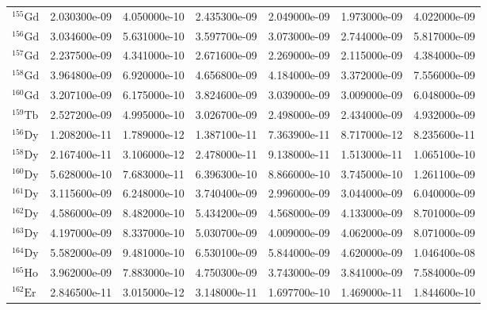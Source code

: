 \begin{tabular}{lrrrrrr}
$^{155}\mathrm{Gd}$ &       2.030300e-09 &      4.050000e-10 &      2.435300e-09 &       2.049000e-09 &      1.973000e-09 &      4.022000e-09 \\
$^{156}\mathrm{Gd}$ &       3.034600e-09 &      5.631000e-10 &      3.597700e-09 &       3.073000e-09 &      2.744000e-09 &      5.817000e-09 \\
$^{157}\mathrm{Gd}$ &       2.237500e-09 &      4.341000e-10 &      2.671600e-09 &       2.269000e-09 &      2.115000e-09 &      4.384000e-09 \\
$^{158}\mathrm{Gd}$ &       3.964800e-09 &      6.920000e-10 &      4.656800e-09 &       4.184000e-09 &      3.372000e-09 &      7.556000e-09 \\
$^{160}\mathrm{Gd}$ &       3.207100e-09 &      6.175000e-10 &      3.824600e-09 &       3.039000e-09 &      3.009000e-09 &      6.048000e-09 \\
$^{159}\mathrm{Tb}$ &       2.527200e-09 &      4.995000e-10 &      3.026700e-09 &       2.498000e-09 &      2.434000e-09 &      4.932000e-09 \\
$^{156}\mathrm{Dy}$ &       1.208200e-11 &      1.789000e-12 &      1.387100e-11 &       7.363900e-11 &      8.717000e-12 &      8.235600e-11 \\
$^{158}\mathrm{Dy}$ &       2.167400e-11 &      3.106000e-12 &      2.478000e-11 &       9.138000e-11 &      1.513000e-11 &      1.065100e-10 \\
$^{160}\mathrm{Dy}$ &       5.628000e-10 &      7.683000e-11 &      6.396300e-10 &       8.866000e-10 &      3.745000e-10 &      1.261100e-09 \\
$^{161}\mathrm{Dy}$ &       3.115600e-09 &      6.248000e-10 &      3.740400e-09 &       2.996000e-09 &      3.044000e-09 &      6.040000e-09 \\
$^{162}\mathrm{Dy}$ &       4.586000e-09 &      8.482000e-10 &      5.434200e-09 &       4.568000e-09 &      4.133000e-09 &      8.701000e-09 \\
$^{163}\mathrm{Dy}$ &       4.197000e-09 &      8.337000e-10 &      5.030700e-09 &       4.009000e-09 &      4.062000e-09 &      8.071000e-09 \\
$^{164}\mathrm{Dy}$ &       5.582000e-09 &      9.481000e-10 &      6.530100e-09 &       5.844000e-09 &      4.620000e-09 &      1.046400e-08 \\
$^{165}\mathrm{Ho}$ &       3.962000e-09 &      7.883000e-10 &      4.750300e-09 &       3.743000e-09 &      3.841000e-09 &      7.584000e-09 \\
$^{162}\mathrm{Er}$ &       2.846500e-11 &      3.015000e-12 &      3.148000e-11 &       1.697700e-10 &      1.469000e-11 &      1.844600e-10 \\

\end{tabular}
